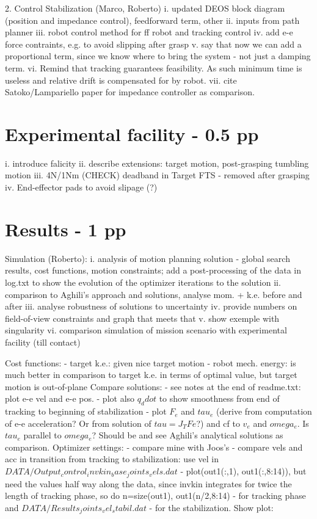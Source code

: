 2. Control Stabilization (Marco, Roberto)
	i. updated DEOS block diagram (position and impedance control), feedforward term, other
	ii. inputs from path planner
	iii. robot control method for ff robot and tracking control
	iv. add e-e force contraints, e.g. to avoid slipping after grasp
	v. say that now we can add a proportional term, since we know where to bring the system - not just a damping term.
	vi. Remind that tracking guarantees feasibility. As such minimum time is useless and relative drift is compensated for by robot.
	vii. cite Satoko/Lampariello paper for impedance controller as comparison.
%
\section{Experimental facility - 0.5 pp}

	
	i. introduce falicity
	ii. describe extensions: target motion, post-grasping tumbling motion
	iii. 4N/1Nm (CHECK) deadband in Target FTS - removed after grasping
	iv. End-effector pads to avoid slipage (?)

%
\section{Results - 1 pp}

Simulation (Roberto):
	i. analysis of motion planning solution - global search results, cost functions, motion constraints; add a post-processing of the data in log.txt to show the evolution of the optimizer iterations to the solution
	ii. comparison to Aghili's approach and solutions, analyse mom. + k.e. before and after
	iii. analyse robustness of solutions to uncertainty
	iv. provide numbers on field-of-view constraints and graph that meets that
	v. show exemple with singularity
	vi. comparison simulation of mission scenario with experimental facility (till contact)

Cost functions: 
	- target k.e.: given nice target motion
	- robot mech. energy: is much better in comparison to target k.e. in terms of optimal value, but target motion is out-of-plane
Compare solutions:
	- see notes at the end of readme.txt: plot e-e vel and e-e pos.
	- plot also $q_ddot$ to show smoothness from end of tracking to beginning of stabilization
	- plot $F_e$ and $tau_e$ (derive from computation of e-e acceleration? Or from solution of $tau=J_T Fe$?) and cf to $v_e$ and $omega_e$. 	Is $tau_e$ parallel to $omega_e$? Should be and see Aghili's analytical solutions as comparison.
Optimizer settings:
	- compare mine with Joos's
	- compare vels and acc in transition from tracking to stabilization: use vel in $DATA/Output_control_invkin_base_joints_vels.dat$ - 			plot(out1(:,1), out1(:,8:14)), but need the values half way along the data, since invkin integrates for twice the length of tracking 			phase, so do n=size(out1), out1(n/2,8:14)  - for tracking phase and $DATA/Results_joints_vel_stabil.dat$ - for the stabilization. Show 			plot: 
	
